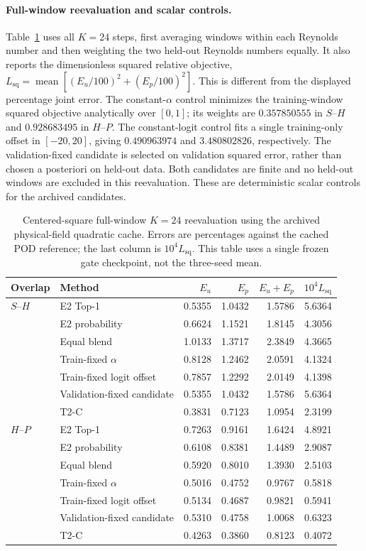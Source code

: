\paragraph{Full-window reevaluation and scalar controls.}
Table~\ref{tab:t2c_full_window_controls} uses all $K=24$ steps, first
averaging windows within each Reynolds number and then weighting the
two held-out Reynolds numbers equally. It also reports the dimensionless
squared relative objective, $L_{\mathrm{sq}}=\operatorname{mean}
[(E_u/100)^2+(E_p/100)^2]$. This is different from the displayed
percentage joint error. The constant-$\alpha$ control minimizes the
training-window squared objective analytically over $[0,1]$; its weights
are $0.357850555$ in $S$--$H$ and $0.928683495$ in $H$--$P$.
The constant-logit control fits a single training-only offset in
$[-20,20]$, giving $0.490963974$ and $3.480802826$, respectively.
The validation-fixed candidate is selected on validation squared error,
rather than chosen a posteriori on held-out data. Both candidates are
finite and no held-out windows are excluded in this reevaluation.
These are deterministic scalar controls for the archived candidates.

\begin{table}[H]
\centering
\caption{Centered-square full-window $K=24$ reevaluation using the
archived physical-field quadratic cache. Errors are percentages against
the cached POD reference; the last column is $10^4 L_{\mathrm{sq}}$.
This table uses a single frozen gate checkpoint, not the three-seed mean.}
\label{tab:t2c_full_window_controls}
\small
\setlength{\tabcolsep}{3.5pt}
\begin{tabular}{@{}llrrrr@{}}
\toprule
Overlap & Method & $E_u$ & $E_p$ & $E_u+E_p$ & $10^4L_{\mathrm{sq}}$\\
\midrule
$S$--$H$ & E2 Top-1 & 0.5355 & 1.0432 & 1.5786 & 5.6364 \\
 & E2 probability & 0.6624 & 1.1521 & 1.8145 & 4.3056 \\
 & Equal blend & 1.0133 & 1.3717 & 2.3849 & 4.3665 \\
 & Train-fixed $\alpha$ & 0.8128 & 1.2462 & 2.0591 & 4.1324 \\
 & Train-fixed logit offset & 0.7857 & 1.2292 & 2.0149 & 4.1398 \\
 & Validation-fixed candidate & 0.5355 & 1.0432 & 1.5786 & 5.6364 \\
 & T2-C & 0.3831 & 0.7123 & 1.0954 & 2.3199 \\
\midrule
$H$--$P$ & E2 Top-1 & 0.7263 & 0.9161 & 1.6424 & 4.8921 \\
 & E2 probability & 0.6108 & 0.8381 & 1.4489 & 2.9087 \\
 & Equal blend & 0.5920 & 0.8010 & 1.3930 & 2.5103 \\
 & Train-fixed $\alpha$ & 0.5016 & 0.4752 & 0.9767 & 0.5818 \\
 & Train-fixed logit offset & 0.5134 & 0.4687 & 0.9821 & 0.5941 \\
 & Validation-fixed candidate & 0.5310 & 0.4758 & 1.0068 & 0.6323 \\
 & T2-C & 0.4263 & 0.3860 & 0.8123 & 0.4072 \\
\bottomrule
\end{tabular}
\end{table}

